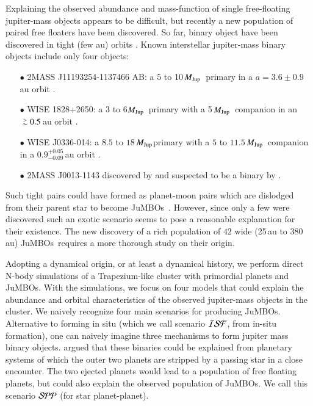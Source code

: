 \documentclass[aa]{lib/aa}
\newcommand{\MJup}{\mbox{${M}_{\rm Jup}$}}
\def\apgt{\ {\raise-.5ex\hbox{$\buildrel>\over\sim$}}\ }
\newcommand{\jumbos}{\mbox{JuMBOs}}
\begin{document}
Explaining the observed abundance and mass-function of single
free-floating jupiter-mass objects appears to be difficult, but
recently a new population of paired free floaters have been
discovered.  So far, binary object have been discovered in tight (few
au) orbits \citep{2021ApJS..253....7K}.  Known interstellar
jupiter-mass binary objects include only four objects:
\begin{itemize}
\item[$\bullet$]2MASS J11193254-1137466 AB: a $5$ to 10\,\MJup\,
  primary in a $a=3.6\pm0.9$\,au orbit \citep{2017ApJ...843L...4B}.
\item[$\bullet$]WISE 1828+2650: a 3 to 6\MJup\, primary with a
  5\,\MJup\ companion in an $\apgt 0.5$\,au orbit
  \citep{2013ApJ...764..101B}.
\item[$\bullet$] WISE J0336-014: a $8.5$ to
  $18$\,\MJup primary with a $5$ to $11.5$\,\MJup\, companion in a
  $0.9^{+0.05}_{-0.09}$\,au orbit \citep{2023ApJ...947L..30C}.
\item[$\bullet$]2MASS J0013-1143 discovered by \cite{2017AJ....154..112K} and
  suspected to be a binary by \cite{2019A&A...629A.145E}.
\end{itemize}

Such tight pairs could have formed as planet-moon pairs which are
dislodged from their parent star to become \jumbos\,
\cite{2016ApJ...819..125C}.  However, since only a few were discovered
such an exotic scenario seems to pose a reasonable explanation for
their existence.  The new discovery of a rich population of $42$ wide
(25\,au to 380\,au) \jumbos\, \cite{2023arXiv231001231P} requires a
more thorough study on their origin.

Adopting a dynamical origin, or at least a dynamical history, we
perform direct N-body simulations of a Trapezium-like cluster with
primordial planets and \jumbos. With the simulations, we focus on four
models that could explain the abundance and orbital characteristics of
the observed jupiter-mass objects in the cluster.  We naively
recognize four main scenarios for producing \jumbos.  Alternative to
forming in situ (which we call scenario ${\cal ISF}$, from in-situ
formation), one can naively imagine three mechanisms to form jupiter
mass binary objects. \cite{2023arXiv231006016W} argued that these
binaries could be explained from planetary systems of which the outer
two planets are stripped by a passing star in a close encounter. The
two ejected planets would lead to a population of free floating
planets, but could also explain the observed population of \jumbos.
We call this scenario ${\cal SPP}$ (for star planet-planet).
\end{document}
